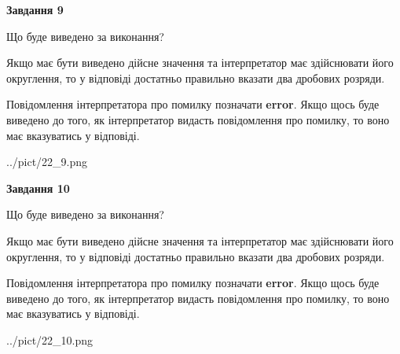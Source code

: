 \documentclass[12pt, ukrainian]{article}
\begin{document}
{\begin {Large}
{\begin {center}\textbf{Завдання 9}\end {center}}\par
Що буде виведено за виконання? \par

Якщо має бути виведено дійсне значення та інтерпретатор має здійснювати його округлення, 
то у відповіді достатньо правильно вказати два дробових розряди.

Повідомлення інтерпретатора про помилку позначати \textbf{error}.
Якщо щось буде виведено до того, як інтерпретатор видасть повідомлення про помилку, 
то воно має вказуватись у відповіді. \par

\begin{center}
	{../pict/22_9.png}
\end{center}
\newpage

{\begin {center}\textbf{Завдання 10}\end {center}}\par
Що буде виведено за виконання? \par

Якщо має бути виведено дійсне значення та інтерпретатор має здійснювати його округлення, 
то у відповіді достатньо правильно вказати два дробових розряди.

Повідомлення інтерпретатора про помилку позначати \textbf{error}.
Якщо щось буде виведено до того, як інтерпретатор видасть повідомлення про помилку, 
то воно має вказуватись у відповіді. \par

\begin{center}
	{../pict/22_10.png}
\end{center}
\newpage

\end {Large}}
\end{document}
